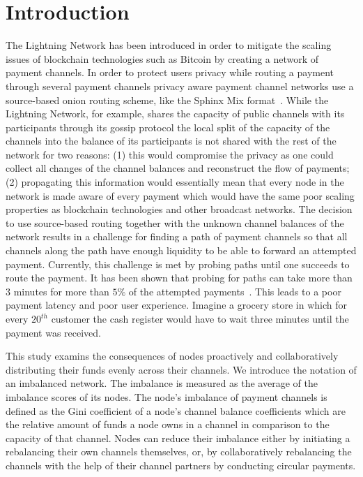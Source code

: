 \documentclass[conference]{IEEEtran}
\begin{document}
\section{Introduction}
The Lightning Network has been introduced in order to mitigate the scaling issues of blockchain technologies such as Bitcoin\cite{poon2016bitcoin} by creating a network of payment channels.
In order to protect users privacy while routing a payment through several payment channels privacy aware payment channel networks use a source-based onion routing scheme, like the Sphinx Mix format~\cite{danezis2009sphinx}.
While the Lightning Network, for example, shares the capacity of public channels with its participants through its gossip protocol the local split of the capacity of the channels into the balance of its participants is not shared with the rest of the network for two reasons:
(1) this would compromise the privacy as one could collect all changes of the channel balances and reconstruct the flow of payments;
(2) propagating this information would essentially mean that every node in the network is made aware of every payment which would have the same poor scaling properties as blockchain technologies and other broadcast networks.
The decision to use source-based routing together with the unknown channel balances of the network results in a challenge for finding a path of payment channels so that all channels along the path have enough liquidity to be able to forward an attempted payment.
Currently, this challenge is met by probing paths until one succeeds to route the payment.
It has been shown that probing for paths can take more than 3 minutes for more than $5\%$ of the attempted payments~\cite{decker2019lnconf}. This leads to a poor payment latency and poor user experience.
Imagine a grocery store in which for every $20^{th}$ customer the cash register would have to wait three minutes until the payment was received.

This study examins the consequences of nodes proactively and collaboratively distributing their funds evenly across their channels.
We introduce the notation of an imbalanced network.
The imbalance is measured as the average of the imbalance scores of its nodes.
The node's imbalance of payment channels is defined as the Gini coefficient of a node's channel balance coefficients which are the relative amount of funds a node owns in a channel in comparison to the capacity of that channel.
Nodes can reduce their imbalance either by initiating a rebalancing their own channels themselves, or, by collaboratively rebalancing the channels with the help of their channel partners by conducting circular payments.
\end{document}
